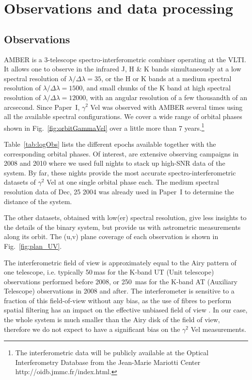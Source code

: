 \documentclass[usenatbib]{mnras}%
\begin{document}
\section{Observations and data processing}\label{sec:obs}

\subsection{Observations}
AMBER is a 3-telescope spectro-interferometric combiner \citep{Petrov2007} operating at the VLTI. It allows one to observe in the infrared J, H \& K bands simultaneously at a low spectral resolution of $\lambda/\Delta\lambda=35$, or the H or K bands at a
medium spectral resolution of $\lambda/\Delta\lambda=1500$, and small chunks of the K band at high spectral resolution of
$\lambda/\Delta\lambda=12000$,  with an angular resolution of a few thousandth of an arcsecond.  Since Paper~I, $\gamma^2$ Vel was observed with AMBER several times using all the available spectral configurations. We cover a wide range of orbital phases shown in Fig.~\ref{fig:orbitGammaVel} over a little more than 7 years.\footnote{The interferometric data will be publicly available at the Optical Interferometry Database from the Jean-Marie Mariotti Center http://oidb.jmmc.fr/index.html.}


Table~\ref{tab:logObs} lists the different epochs available together with the corresponding orbital phases. Of interest, are extensive observing campaigns in 2008 and 2010 where we used full nights to stack up high-SNR data of the system. By far, these nights provide the most accurate spectro-interferometric datasets of $\gamma^2$ Vel at one single orbital phase each. The medium spectral resolution data of  Dec, 25 2004 was already used in Paper~I to determine the distance of the system. 

The other datasets, obtained with low(er) spectral resolution, give less insights to the details of the binary system, but provide us with astrometric measurements along its orbit. The (u,v) plane coverage of each observation is shown in Fig.~\ref{fig:plan_UV}.

The interferometric field of view is approximately equal to the Airy pattern of one telescope, i.e. typically 50\,mas for the K-band UT (Unit telescope) observations performed before 2008, or 250\, mas for the K-band AT (Auxiliary Telescope) observations in 2008 and after. The interferometer is sensitive to a fraction of this field-of-view without any bias, as the use of fibres to perform spatial filtering has an impact on the effective unbiased field of view \citep{2004A&A...418.1179T}. In our case, the whole system is much smaller than the Airy disk of the field of view, therefore we do not expect to have a significant bias on the $\gamma^2$ Vel measurements.
\end{document}
